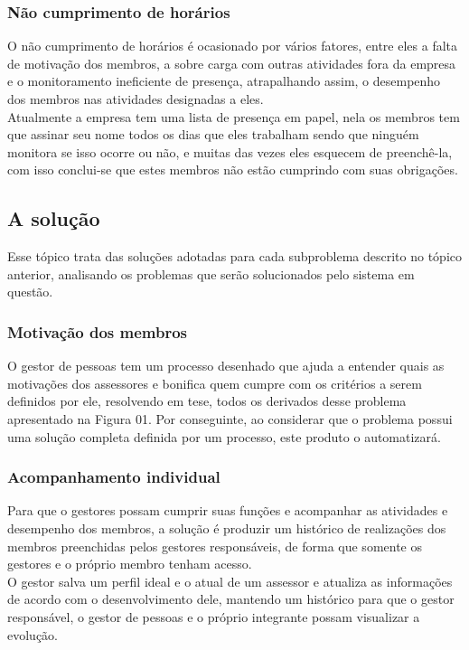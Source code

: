 \begin{anexosenv}
\subsubsection[Não cumprimento de horários]{Não cumprimento de horários}


O não cumprimento de horários é ocasionado por vários fatores, entre eles a falta de motivação dos membros, a sobre carga com outras atividades fora da empresa e o monitoramento ineficiente de presença, atrapalhando assim, o desempenho dos membros nas atividades designadas a eles.\\
Atualmente a empresa tem uma lista de presença em papel, nela os membros tem que assinar seu nome todos os dias que eles trabalham sendo que ninguém monitora se isso ocorre ou não, e muitas das vezes eles esquecem de preenchê-la, com isso conclui-se que estes membros não estão cumprindo com suas obrigações.\\

\subsection[A solução]{A solução}

Esse tópico trata das soluções adotadas para cada subproblema descrito no tópico anterior, analisando os problemas que serão solucionados pelo sistema em questão.\\

\subsubsection[Motivação dos membros]{Motivação dos membros}

O gestor de pessoas tem um processo desenhado que  ajuda a entender quais as motivações dos assessores e bonifica quem cumpre com os critérios a serem definidos por ele, resolvendo em tese, todos os derivados desse problema apresentado na Figura 01. Por conseguinte, ao considerar que o problema possui uma solução completa definida por um processo, este produto o automatizará.\\

\subsubsection[Acompanhamento individual]{Acompanhamento individual}

Para que o gestores possam cumprir suas funções e acompanhar as atividades e desempenho dos membros, a solução é produzir um histórico de realizações dos membros preenchidas pelos gestores responsáveis, de forma que somente os gestores e o próprio membro tenham acesso.\\
O gestor salva um perfil ideal e o atual de um assessor e atualiza as informações de acordo com o desenvolvimento dele, mantendo um histórico para que o gestor responsável, o gestor de pessoas e o próprio integrante possam visualizar a evolução.\\


\end{anexosenv}

